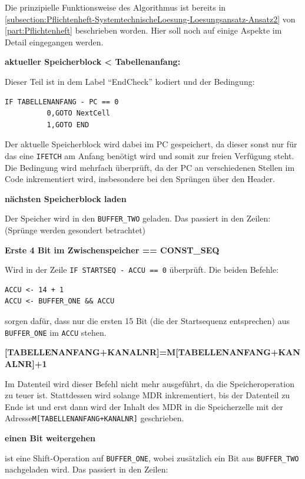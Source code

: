 Die prinzipielle Funktionsweise des Algorithmus ist bereits in \autoref{subsection:Pflichtenheft-SystemtechnischeLoesung-Loesungsansatz-Ansatz2} von \autoref{part:Pflichtenheft} beschrieben worden. Hier soll noch auf einige Aspekte im Detail eingegangen werden.

\textbf{aktueller Speicherblock < Tabellenanfang:}

Dieser Teil ist in dem Label "`EndCheck"' kodiert und der Bedingung:

\begin{verbatim}
IF TABELLENANFANG - PC == 0
          0,GOTO NextCell
          1,GOTO END
\end{verbatim}

Der aktuelle Speicherblock wird dabei im PC gespeichert, da dieser sonst nur für das eine \texttt{IFETCH} am Anfang benötigt wird und somit zur freien Verfügung steht.\\
Die Bedingung wird mehrfach überprüft, da der PC an verschiedenen Stellen im Code inkrementiert wird, insbesondere bei den Sprüngen über den Header.

\textbf{nächsten Speicherblock laden}

Der Speicher wird in den \texttt{BUFFER\_TWO} geladen. Das passiert in den Zeilen: (Sprünge werden gesondert betrachtet) 

\textbf{Erste 4 Bit im Zwischenspeicher == CONST\_SEQ}

Wird in der Zeile \texttt{IF STARTSEQ - ACCU == 0} überprüft. Die beiden Befehle:

\begin{verbatim}
ACCU <- 14 + 1
ACCU <- BUFFER_ONE && ACCU
\end{verbatim}

sorgen dafür, dass nur die ersten 15 Bit (die der Startsequenz entsprechen) aus \texttt{BUFFER\_ONE} im \texttt{ACCU} stehen.

\textbf{[TABELLENANFANG+KANALNR]=M[TABELLENANFANG+KANALNR]+1}

Im Datenteil wird dieser Befehl nicht mehr ausgeführt, da die Speicheroperation zu teuer ist. Stattdessen wird solange MDR inkrementiert, bis der Datenteil zu Ende ist und erst dann wird der Inhalt des MDR in die Speicherzelle mit der Adresse\linebreak \texttt{M[TABELLENANFANG+KANALNR]} geschrieben.

\textbf{einen Bit weitergehen}

ist eine Shift-Operation auf \texttt{BUFFER\_ONE}, wobei zusätzlich ein Bit aus \texttt{BUFFER\_TWO} nachgeladen wird. Das passiert in den Zeilen:

